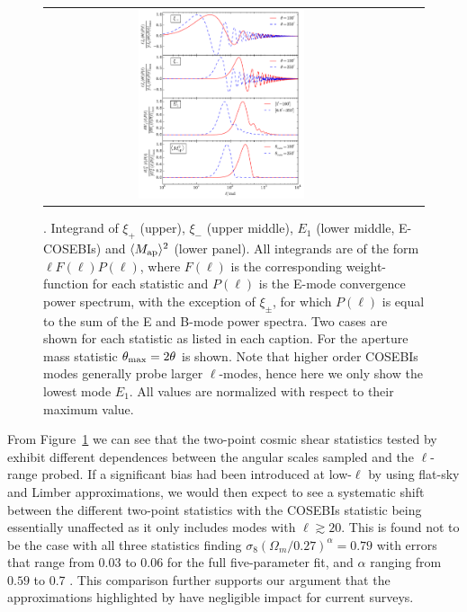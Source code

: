 \begin{figure}%
\begin{center}
\begin{tabular}{ccc}
\includegraphics[width=0.48\textwidth]{figures/IntegAll.pdf} \\
\end{tabular}
\caption{ \small{\label{fig:filters}. Integrand of $\xi_+$ (upper), $\xi_-$ (upper middle), $E_1$ (lower middle, E-COSEBIs) and $\langle M_{\rm ap} \rangle^2$ (lower panel).
All integrands are of the form $\ell F(\ell) P(\ell)$, where $F(\ell)$ is the corresponding weight-function
for each statistic and $P(\ell)$ is the E-mode convergence power spectrum, with the exception of $\xi_\pm$, for which
$P(\ell)$ is equal to the sum of the E and B-mode power spectra. 
Two cases are shown for each statistic as listed in each caption.
For the aperture mass statistic $\theta_{\rm max}=2\theta$ is shown. 
Note that higher order COSEBIs modes generally probe larger $\ell$-modes, 
hence here we only show the lowest mode $E_1$. All values are normalized with respect to their maximum value. }
}
\end{center}
\end{figure}

From Figure~\ref{fig:filters} we can see that the two-point cosmic shear statistics tested by \citet{kilbinger/etal:2013} exhibit different dependences between the angular scales sampled and the $\ell$-range probed.   
If a significant bias had been introduced at low-$\ell$ by using flat-sky and Limber approximations, we would then expect to see a systematic shift between the different two-point statistics with the COSEBIs statistic being essentially unaffected as it only includes modes with $\ell \gtrsim 20$.  This is found not to be the case with all three statistics finding $\sigma_8 (\Omega_m/0.27)^\alpha = 0.79$ with errors that range from $0.03$ to $0.06$ for the full five-parameter fit, and $\alpha$ ranging from $0.59$ to 0.7 \citep[see Table 5 of][]{kilbinger/etal:2013}.  This comparison further supports our argument that the approximations highlighted by \citet{kitching/etal:2016} have negligible impact for current surveys.

